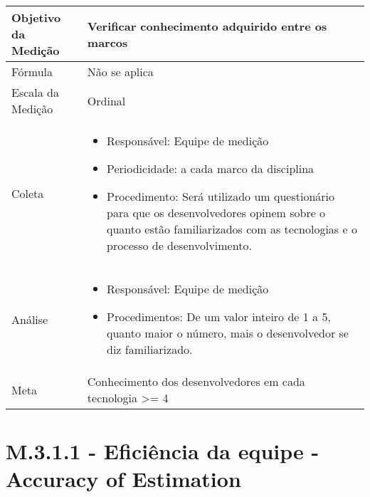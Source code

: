 	\begin{tabular}{ |p{4cm}|p{8cm}|  }
	 \hline
	 Objetivo da Medição 		& Verificar conhecimento adquirido entre os marcos	   \\
	 \hline
	 Fórmula		& 	Não se aplica	\\
	 \hline
	 Escala da Medição 		& 	Ordinal	 \\
	 \hline
	 Coleta		& 	\begin{itemize} \item Responsável: Equipe de medição \item Periodicidade: a cada marco da disciplina \item Procedimento: Será utilizado um questionário para que os desenvolvedores opinem sobre o quanto estão familiarizados com as tecnologias e o processo de desenvolvimento. \end{itemize}		\\
	 \hline
	 Análise		& 	\begin{itemize} \item Responsável: Equipe de medição \item Procedimentos: De um valor inteiro de 1 a 5, quanto maior o número, mais o desenvolvedor se diz familiarizado. \end{itemize}	 \\
	 \hline
	 Meta		& 	Conhecimento dos desenvolvedores em cada tecnologia >= 4	 \\
	 \hline
	\end{tabular}



\section{M.3.1.1 - Eficiência da equipe - Accuracy of Estimation} %

